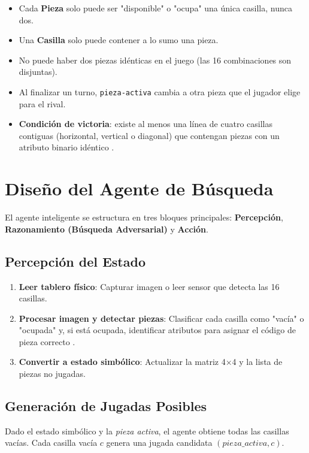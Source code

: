\documentclass[conference]{IEEEtran}
\begin{document}
\begin{itemize}
\item Cada \textbf{Pieza} solo puede ser "disponible" o "ocupa" una única casilla, nunca dos.
\item Una \textbf{Casilla} solo puede contener a lo sumo una pieza.
\item No puede haber dos piezas idénticas en el juego (las 16 combinaciones son disjuntas).
\item Al finalizar un turno, \texttt{pieza-activa} cambia a otra pieza que el jugador elige para el rival.
\item \textbf{Condición de victoria}: existe al menos una línea de cuatro casillas contiguas (horizontal, vertical o diagonal) que contengan piezas con un atributo binario idéntico \cite{muller2009}.
\end{itemize}

\section{Diseño del Agente de Búsqueda}

El agente inteligente se estructura en tres bloques principales: \textbf{Percepción}, \textbf{Razonamiento (Búsqueda Adversarial)} y \textbf{Acción}.

\subsection{Percepción del Estado}

\begin{enumerate}
\item \textbf{Leer tablero físico}: Capturar imagen o leer sensor que detecta las 16 casillas.
\item \textbf{Procesar imagen y detectar piezas}: Clasificar cada casilla como "vacía" o "ocupada" y, si está ocupada, identificar atributos para asignar el código de pieza correcto \cite{muller2009}.
\item \textbf{Convertir a estado simbólico}: Actualizar la matriz 4×4 y la lista de piezas no jugadas.
\end{enumerate}

\subsection{Generación de Jugadas Posibles}

Dado el estado simbólico y la \textit{pieza activa}, el agente obtiene todas las casillas vacías. Cada casilla vacía $c$ genera una jugada candidata $(pieza\_activa, c)$.
\end{document}
